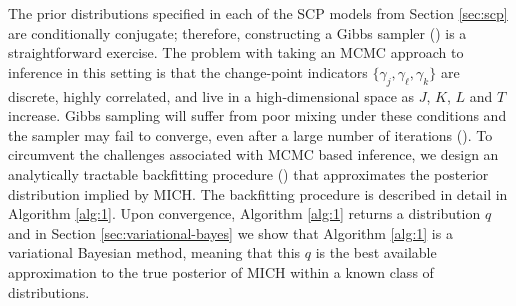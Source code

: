 The prior distributions specified in each of the SCP models from Section \ref{sec:scp} are conditionally conjugate; therefore, constructing a Gibbs sampler (\citealp{Geman84}) is a straightforward exercise. The problem with taking an MCMC approach to inference in this setting is that the change-point indicators $\{\gamma_j,\gamma_\ell,\gamma_k\}$ are discrete, highly correlated, and live in a high-dimensional space as $J$, $K$, $L$ and $T$ increase. Gibbs sampling will suffer from poor mixing under these conditions and the sampler may fail to converge, even after a large number of iterations (\citealp{Smith93, Cappello21}). To circumvent the challenges associated with MCMC based inference, we design an analytically tractable backfitting procedure (\citealp{Friedman81, Breiman85}) that approximates the posterior distribution implied by MICH. The backfitting procedure is described in detail in Algorithm \ref{alg:1}. Upon convergence, Algorithm \ref{alg:1} returns a distribution $q$ and in Section \ref{sec:variational-bayes} we show that Algorithm \ref{alg:1} is a variational Bayesian method, meaning that this $q$ is the best available approximation to the true posterior of MICH within a known class of distributions. 

